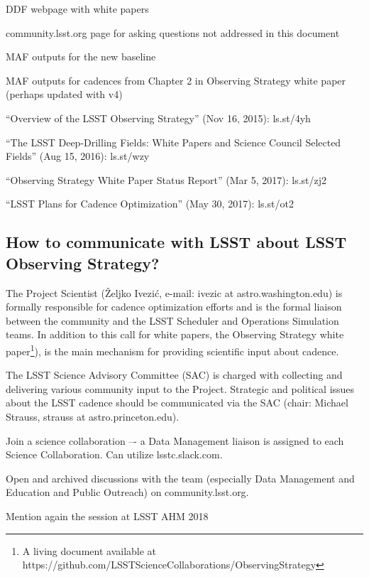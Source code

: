 \documentclass[DM,lsstdraft,toc,usenatbib]{lsstdoc}
\begin{document}
DDF webpage with white papers 

community.lsst.org page for asking questions not addressed in this document 

MAF outputs for the new baseline

MAF outputs for cadences from Chapter 2 in Observing Strategy white paper (perhaps
updated with v4)

``Overview of the LSST Observing Strategy'' (Nov 16, 2015): ls.st/4yh

``The LSST Deep-Drilling Fields: White Papers and Science Council Selected Fields'' (Aug 15, 2016): ls.st/wzy

``Observing Strategy White Paper Status Report'' (Mar 5, 2017): ls.st/zj2

``LSST Plans for Cadence Optimization'' (May 30, 2017): ls.st/ot2 


\subsection{How to communicate with LSST about LSST Observing Strategy?} 

The Project Scientist (\v{Z}eljko Ivezi\'{c}, e-mail: ivezic at astro.washington.edu) is formally 
responsible for cadence optimization efforts and is the formal liaison between the community 
and the LSST Scheduler and Operations Simulation teams. In addition to this call for white papers, 
the Observing Strategy white paper\footnote{A living document available at 
https://github.com/LSSTScienceCollaborations/ObservingStrategy}), 
is the main mechanism for providing scientific input about cadence. 

The LSST Science Advisory Committee (SAC) is charged with collecting and delivering various 
community input to the Project. Strategic and political issues about the LSST cadence should 
be communicated via the SAC (chair: Michael Strauss, strauss at astro.princeton.edu).

Join a science collaboration –- a Data Management liaison is assigned to each Science Collaboration.
Can utilize lsstc.slack.com.

Open and archived discussions with the team (especially Data Management and Education and 
Public Outreach) on community.lsst.org.

Mention again the session at LSST AHM 2018 
\end{document}

